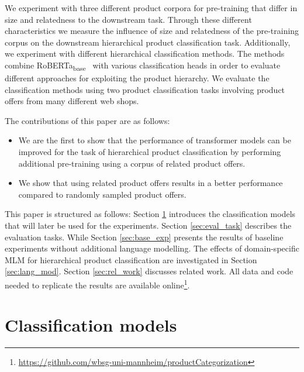 \documentclass[11pt,dvipdfm]{article}
\begin{document}
We experiment with three different product corpora for pre-training that differ in size and relatedness to the downstream task.
Through these different characteristics we measure the influence of size and relatedness of the pre-training corpus on the downstream hierarchical product classification task.
Additionally, we experiment with different hierarchical classification methods. 
The methods combine RoBERTa\textsubscript{base}~\cite{liu_roberta_2019} with various classification heads in order to evaluate different approaches for exploiting the product hierarchy. 
We evaluate the classification methods using two product classification tasks involving product offers from many different web shops.

The contributions of this paper are as follows:
\begin{itemize}
  \item We are the first to show that the performance of transformer models can be improved for the task of hierarchical product classification by performing additional pre-training using a corpus of related product offers.
  \item We show that using related product offers results in a better performance compared to randomly sampled product offers.
\end{itemize}

This paper is structured as follows:
Section \ref{sec:base_models} introduces the classification models that will later be used for the experiments. Section \ref{sec:eval_task} describes the evaluation tasks. While Section \ref{sec:base_exp} presents the results of baseline experiments without additional language modelling. The effects of domain-specific \ac{MLM} for hierarchical product classification are investigated in Section \ref{sec:lang_mod}. 
Section \ref{sec:rel_work} discusses related work.
All data and code needed to replicate the results are available online\footnote{\url{https://github.com/wbsg-uni-mannheim/productCategorization}}.

\section{Classification models}
\label{sec:base_models}
\end{document}
